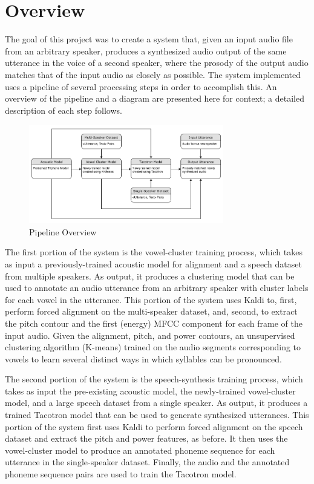 \documentclass{article}
\begin{document}
\section{Overview}
\label{sec:overview}
The goal of this project was to create a system that, given an input audio file from an arbitrary speaker, produces a synthesized audio output of the same utterance in the voice of a second speaker, where the prosody of the output audio matches that of the input audio as closely as possible.
The system implemented uses a pipeline of several processing steps in order to accomplish this.
An overview of the pipeline and a diagram are presented here for context; a detailed description of each step follows.

\begin{figure}[htb]

\begin{minipage}[b]{1.0\linewidth}
  \centering
  \centerline{\includegraphics[width=8.5cm]{Overall_Pipeline}}
\end{minipage}
\caption{Pipeline Overview}
\label{fig:overview}
\end{figure}

The first portion of the system is the vowel-cluster training process, which takes as input a previously-trained acoustic model for alignment and a speech dataset from multiple speakers. As output, it produces a clustering model that can be used to annotate an audio utterance from an arbitrary speaker with cluster labels for each vowel in the utterance. This portion of the system uses Kaldi to, first, perform forced alignment on the multi-speaker dataset, and, second, to extract the pitch contour and the first (energy) MFCC component for each frame of the input audio. Given the alignment, pitch, and power contours, an unsupervised clustering algorithm (K-means) trained on the audio segments corresponding to vowels to learn several distinct ways in which syllables can be pronounced.

The second portion of the system is the speech-synthesis training process, which takes as input the pre-existing acoustic model, the newly-trained vowel-cluster model, and a large speech dataset from a single speaker. As output, it produces a trained Tacotron model that can be used to generate synthesized utterances. This portion of the system first uses Kaldi to perform forced alignment on the speech dataset and extract the pitch and power features, as before. It then uses the vowel-cluster model to produce an annotated phoneme sequence for each utterance in the single-speaker dataset. Finally, the audio and the annotated phoneme sequence pairs are used to train the Tacotron model.
\end{document}
